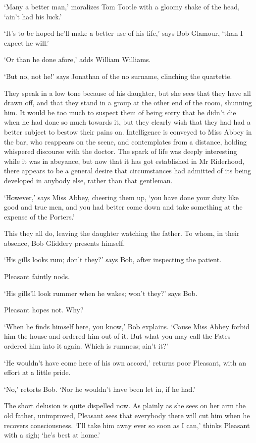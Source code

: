 ‘Many a better man,’ moralizes Tom Tootle with a gloomy shake of the
head, ‘ain’t had his luck.’

‘It’s to be hoped he’ll make a better use of his life,’ says Bob
Glamour, ‘than I expect he will.’

‘Or than he done afore,’ adds William Williams.

‘But no, not he!’ says Jonathan of the no surname, clinching the
quartette.

They speak in a low tone because of his daughter, but she sees that they
have all drawn off, and that they stand in a group at the other end of
the room, shunning him. It would be too much to suspect them of being
sorry that he didn’t die when he had done so much towards it, but they
clearly wish that they had had a better subject to bestow their pains
on. Intelligence is conveyed to Miss Abbey in the bar, who reappears on
the scene, and contemplates from a distance, holding whispered discourse
with the doctor. The spark of life was deeply interesting while it was
in abeyance, but now that it has got established in Mr Riderhood, there
appears to be a general desire that circumstances had admitted of its
being developed in anybody else, rather than that gentleman.

‘However,’ says Miss Abbey, cheering them up, ‘you have done your duty
like good and true men, and you had better come down and take something
at the expense of the Porters.’

This they all do, leaving the daughter watching the father. To whom, in
their absence, Bob Gliddery presents himself.

‘His gills looks rum; don’t they?’ says Bob, after inspecting the
patient.

Pleasant faintly nods.

‘His gills’ll look rummer when he wakes; won’t they?’ says Bob.

Pleasant hopes not. Why?

‘When he finds himself here, you know,’ Bob explains. ‘Cause Miss Abbey
forbid him the house and ordered him out of it. But what you may call
the Fates ordered him into it again. Which is rumness; ain’t it?’

‘He wouldn’t have come here of his own accord,’ returns poor Pleasant,
with an effort at a little pride.

‘No,’ retorts Bob. ‘Nor he wouldn’t have been let in, if he had.’

The short delusion is quite dispelled now. As plainly as she sees on her
arm the old father, unimproved, Pleasant sees that everybody there will
cut him when he recovers consciousness. ‘I’ll take him away ever so soon
as I can,’ thinks Pleasant with a sigh; ‘he’s best at home.’


